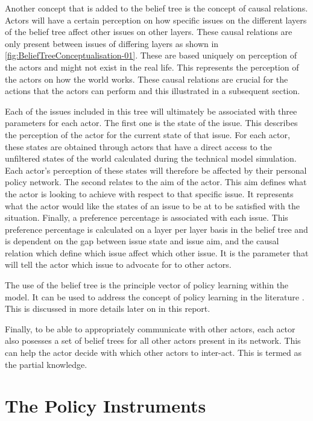 Another concept that is added to the belief tree is the concept of causal relations. Actors will have a certain perception on how specific issues on the different layers of the belief tree affect other issues on other layers. These causal relations are only present between issues of differing layers as shown in \autoref{fig:BeliefTreeConceptualisation-01}. These are based uniquely on perception of the actors and might not exist in the real life. This represents the perception of the actors on how the world works. These causal relations are crucial for the actions that the actors can perform and this illustrated in a subsequent section.
 
Each of the issues included in this tree will ultimately be associated with three parameters for each actor. The first one is the state of the issue. This describes the perception of the actor for the current state of that issue. For each actor, these states are obtained through actors that have a direct access to the unfiltered states of the world calculated during the technical model simulation. Each actor's perception of these states will therefore be affected by their personal policy network. The second relates to the aim of the actor. This aim defines what the actor is looking to achieve with respect to that specific issue. It represents what the actor would like the states of an issue to be at to be satisfied with the situation. Finally, a preference percentage is associated with each issue. This preference percentage is calculated on a layer per layer basis in the belief tree and is dependent on the gap between issue state and issue aim, and the causal relation which define which issue affect which other issue. It is the parameter that will tell the actor which issue to advocate for to other actors.
 
The use of the belief tree is the principle vector of policy learning within the model. It can be used to address the concept of policy learning in the literature \citep{meijerink2008explaining, hoberg1996putting, howlett2002policy, hall1993policy}. This is discussed in more details later on in this report.

Finally, to be able to appropriately communicate with other actors, each actor also posesses a set of belief trees for all other actors present in its network. This can help the actor decide with which other actors to inter-act. This is termed as the partial knowledge.

%
\section{The Policy Instruments}
\label{sec:policyInstruments}

